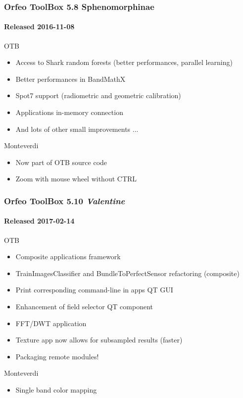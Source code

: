 \documentclass[8pt]{beamer}
\begin{document}
\begin{frame}
\frametitle{Orfeo ToolBox 5.8 Sphenomorphinae}
\framesubtitle{Released 2016-11-08}
\begin{block}{OTB}
\begin{itemize}
\item Access to Shark random forests (better performances, parallel learning)
\item Better performances in BandMathX
\item Spot7 support (radiometric and geometric calibration)
\item Applications in-memory connection
\item And lots of other small improvements ...
\end{itemize}
\end{block}

\begin{block}{Monteverdi}
\begin{itemize}
\item Now part of OTB source code
\item Zoom with mouse wheel without CTRL
\end{itemize}
\end{block}
\end{frame}


\begin{frame}
\frametitle{Orfeo ToolBox 5.10 \textit{Valentine}}
\framesubtitle{Released 2017-02-14}
  \begin{block}{OTB}
    \begin{itemize}
      \item Composite applications framework
      \item TrainImagesClassifier and BundleToPerfectSensor refactoring (composite)
      \item Print corresponding command-line in apps QT GUI
      \item Enhancement of field selector QT component
      \item FFT/DWT application
      \item Texture app now allows for subsampled results (faster)
      \item Packaging remote modules!
    \end{itemize}
  \end{block}

  \begin{block}{Monteverdi}
    \begin{itemize}
      \item Single band color mapping
      \end{itemize}
  \end{block}

\end{frame}
\end{document}

